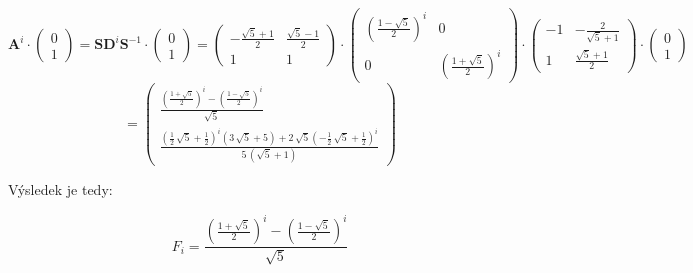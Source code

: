 \documentclass{fkssolpub}
\begin{document}
\[
  \mathbf{A}^i \cdot \begin{pmatrix}
    0 \\ 1
  \end{pmatrix} = \mathbf{S} \mathbf{D}^i \mathbf{S}^{-1} \cdot \begin{pmatrix}
    0 \\ 1
  \end{pmatrix} = \begin{pmatrix}
    - \frac{\sqrt{5} + 1}{2} & \frac{\sqrt{5} - 1}{2} \\
    1 & 1
  \end{pmatrix} \cdot \begin{pmatrix}
    \left(\frac{1 - \sqrt{5}}{2}\right)^i & 0 \\
    0 & \left(\frac{1 + \sqrt{5}}{2}\right)^i
  \end{pmatrix} \cdot \left(\begin{array}{rr}
-1 & -\frac{2}{\sqrt{5} + 1} \\
1 & \frac{\sqrt{5} + 1}{2}
\end{array}\right) \cdot \begin{pmatrix}
    0 \\ 1
  \end{pmatrix}
\]
\[
= \left(\begin{array}{r}
  \frac{{\left(\frac{1 + \sqrt{5}}{2}\right)}^{i} - {\left(\frac{1 - \sqrt{5}}{2}\right)}^{i}}{\sqrt{5}} \\
\frac{{\left(\frac{1}{2} \, \sqrt{5} + \frac{1}{2}\right)}^{i} {\left(3 \, \sqrt{5} + 5\right)} + 2 \, \sqrt{5} {\left(-\frac{1}{2} \, \sqrt{5} + \frac{1}{2}\right)}^{i}}{5 \, {\left(\sqrt{5} + 1\right)}}
\end{array}\right)
\]

Výsledek je tedy:

\[
  F_i = \frac{{\left(\frac{1 + \sqrt{5}}{2}\right)}^{i} - {\left(\frac{1 - \sqrt{5}}{2}\right)}^{i}}{\sqrt{5}}
\]
\end{document}
